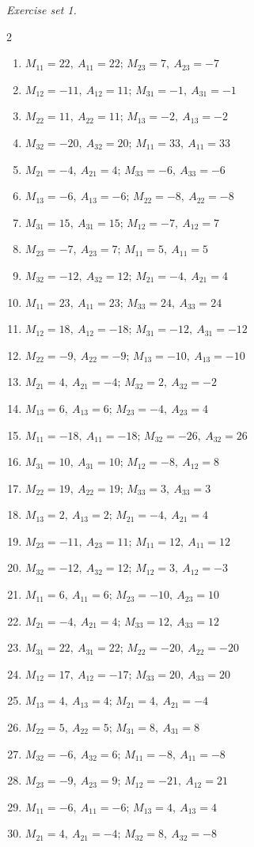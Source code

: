 \par\noindent\emph{Exercise set 1.}\nopagebreak
\begin{multicols}{2}\raggedright
\begin{enumerate}[label=\arabic*., leftmargin=*, itemsep=1pt]
\item $M_{11}=22,\ A_{11}=22;\,M_{23}=7,\ A_{23}=-7$
\item $M_{12}=-11,\ A_{12}=11;\,M_{31}=-1,\ A_{31}=-1$
\item $M_{22}=11,\ A_{22}=11;\,M_{13}=-2,\ A_{13}=-2$
\item $M_{32}=-20,\ A_{32}=20;\,M_{11}=33,\ A_{11}=33$
\item $M_{21}=-4,\ A_{21}=4;\,M_{33}=-6,\ A_{33}=-6$
\item $M_{13}=-6,\ A_{13}=-6;\,M_{22}=-8,\ A_{22}=-8$
\item $M_{31}=15,\ A_{31}=15;\,M_{12}=-7,\ A_{12}=7$
\item $M_{23}=-7,\ A_{23}=7;\,M_{11}=5,\ A_{11}=5$
\item $M_{32}=-12,\ A_{32}=12;\,M_{21}=-4,\ A_{21}=4$
\item $M_{11}=23,\ A_{11}=23;\,M_{33}=24,\ A_{33}=24$
\item $M_{12}=18,\ A_{12}=-18;\,M_{31}=-12,\ A_{31}=-12$
\item $M_{22}=-9,\ A_{22}=-9;\,M_{13}=-10,\ A_{13}=-10$
\item $M_{21}=4,\ A_{21}=-4;\,M_{32}=2,\ A_{32}=-2$
\item $M_{13}=6,\ A_{13}=6;\,M_{23}=-4,\ A_{23}=4$
\item $M_{11}=-18,\ A_{11}=-18;\,M_{32}=-26,\ A_{32}=26$
\item $M_{31}=10,\ A_{31}=10;\,M_{12}=-8,\ A_{12}=8$
\item $M_{22}=19,\ A_{22}=19;\,M_{33}=3,\ A_{33}=3$
\item $M_{13}=2,\ A_{13}=2;\,M_{21}=-4,\ A_{21}=4$
\item $M_{23}=-11,\ A_{23}=11;\,M_{11}=12,\ A_{11}=12$
\item $M_{32}=-12,\ A_{32}=12;\,M_{12}=3,\ A_{12}=-3$
\item $M_{11}=6,\ A_{11}=6;\,M_{23}=-10,\ A_{23}=10$
\item $M_{21}=-4,\ A_{21}=4;\,M_{33}=12,\ A_{33}=12$
\item $M_{31}=22,\ A_{31}=22;\,M_{22}=-20,\ A_{22}=-20$
\item $M_{12}=17,\ A_{12}=-17;\,M_{33}=20,\ A_{33}=20$
\item $M_{13}=4,\ A_{13}=4;\,M_{21}=4,\ A_{21}=-4$
\item $M_{22}=5,\ A_{22}=5;\,M_{31}=8,\ A_{31}=8$
\item $M_{32}=-6,\ A_{32}=6;\,M_{11}=-8,\ A_{11}=-8$
\item $M_{23}=-9,\ A_{23}=9;\,M_{12}=-21,\ A_{12}=21$
\item $M_{11}=-6,\ A_{11}=-6;\,M_{13}=4,\ A_{13}=4$
\item $M_{21}=4,\ A_{21}=-4;\,M_{32}=8,\ A_{32}=-8$
\end{enumerate}
\end{multicols}
